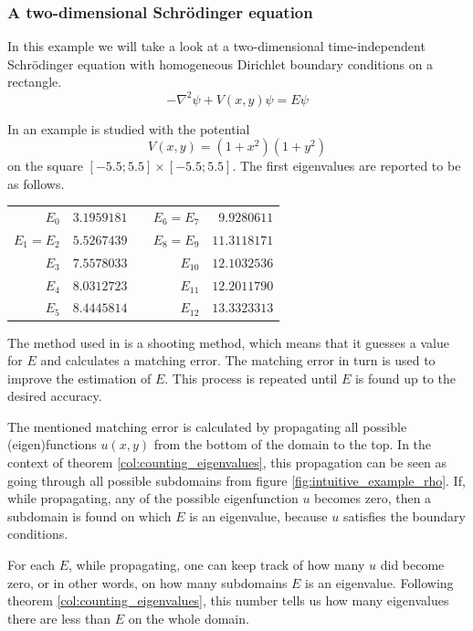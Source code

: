 \subsubsection{A two-dimensional Schrödinger equation}\label{exa:ixaru}

In this example we will take a look at a two-dimensional time-independent Schrödinger equation with homogeneous Dirichlet boundary conditions on a rectangle.
$$
  -\nabla^2 \psi + V(x, y)\psi = E\psi
$$

In \cite{ixaru_new_2010} an example is studied with the potential
$$
  V(x, y) = (1+x^2)(1+y^2)
$$
on the square $[-5.5; 5.5] \times [-5.5; 5.5]$. The first eigenvalues are reported to be as follows.

\begin{center}
  \begin{tabular}{r|rcr|r}
    $E_{0}$         & $3.1959181$ & \hspace*{2cm} & $E_{6} = E_{7}$ & $9.9280611$  \\
    $E_{1} = E_{2}$ & $5.5267439$ &               & $E_{8} = E_{9}$ & $11.3118171$ \\
    $E_{3}$         & $7.5578033$ &               & $E_{10}$        & $12.1032536$ \\
    $E_{4}$         & $8.0312723$ &               & $E_{11}$        & $12.2011790$ \\
    $E_{5}$         & $8.4445814$ &               & $E_{12}$        & $13.3323313$ \\
  \end{tabular}
\end{center}

The method used in \cite{ixaru_new_2010} is a shooting method, which means that it guesses a value for $E$ and calculates a matching error. The matching error in turn is used to improve the estimation of $E$. This process is repeated until $E$ is found up to the desired accuracy.

The mentioned matching error is calculated by propagating all possible (eigen)functions $u(x, y)$ from the bottom of the domain to the top. In the context of theorem \ref{col:counting_eigenvalues}, this propagation can be seen as going through all possible subdomains from figure \ref{fig:intuitive_example_rho}. If, while propagating, any of the possible eigenfunction $u$ becomes zero, then a subdomain is found on which $E$ is an eigenvalue, because $u$ satisfies the boundary conditions.

For each $E$, while propagating, one can keep track of how many $u$ did become zero, or in other words, on how many subdomains $E$ is an eigenvalue. Following theorem \ref{col:counting_eigenvalues}, this number tells us how many eigenvalues there are less than $E$ on the whole domain.

